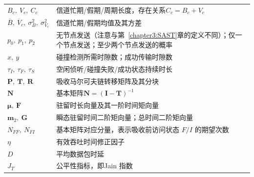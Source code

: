 \begin{longtable}{p{4.0cm}p{11.0cm}}
        $B_c,\ V_c,\ C_c$ &信道忙期/假期/周期长度，存在关系$C_c=B_c+V_c$\\
        $\overline{B},\ \overline{V}_c,\ \sigma_B^2,\ \sigma_{V_c}^2$ &信道忙期/假期均值及其方差\\
        $p_0,\ p_1,\ p_2$ & 无节点发送（注意与第~\ref{chapter3:SAST}章的定义不同）；仅一个节点发送；至少两个节点发送的概率\\
        $x,\ y$ &碰撞检测所需时隙数；成功传输时隙数\\
        $\tau_I,\ \tau_F,\ \tau_S$ &空闲侦听/碰撞失败/成功状态持续时长\\
        $\mathbf{P},\ \mathbf{T},\ \mathbf{R}$ &吸收马尔可夫链转移矩阵及其分块\\
        $\mathbf{N}$ &基本矩阵$\mathbf{N}=(\mathbf{I}-\mathbf{T})^{-1}$\\
        $\boldsymbol{\mu},\ \mathbf{F}$ &驻留时长向量及其一阶时间矩向量\\
        $\mathbf{m}_2,\ \mathbf{G}$ &瞬态驻留时间二阶矩向量；总时间二阶矩向量\\
        $N_{FF},\ N_{FI}$ &基本矩阵对应分量，表示吸收前访问状态 $F/I$ 的期望次数\\
        $\eta$ &有效吞吐时间修正因子\\
        $D$ &平均数据包时延\\
        $J_T$ &公平性指标，即Jain 指数\\


\end{longtable}

